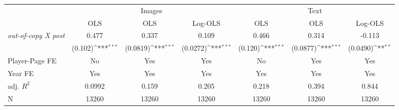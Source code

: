 {
\def\sym#1{\ifmmode^{#1}\else\(^{#1}\)\fi}
\begin{tabular*}{\hsize}{@{\hskip\tabcolsep\extracolsep\fill}l*{6}{c}}
\toprule
            &\multicolumn{3}{c}{Images}                                       &\multicolumn{3}{c}{Text}                                         \\\cmidrule(lr){2-4}\cmidrule(lr){5-7}
            &\multicolumn{1}{c}{OLS}&\multicolumn{1}{c}{OLS}&\multicolumn{1}{c}{Log-OLS}&\multicolumn{1}{c}{OLS}&\multicolumn{1}{c}{OLS}&\multicolumn{1}{c}{Log-OLS}\\
\midrule
\emph{out-of-copy X post}&       0.477         &       0.337         &       0.109         &       0.466         &       0.314         &      -0.113         \\
            &     (0.102)\sym{***}&    (0.0819)\sym{***}&    (0.0272)\sym{***}&     (0.120)\sym{***}&    (0.0877)\sym{***}&    (0.0490)\sym{**} \\
\midrule
Player-Page FE&          No         &         Yes         &         Yes         &          No         &         Yes         &         Yes         \\
Year FE     &         Yes         &         Yes         &         Yes         &         Yes         &         Yes         &         Yes         \\
adj. $R^2$  &      0.0992         &       0.159         &       0.205         &       0.218         &       0.394         &       0.844         \\
N           &       13260         &       13260         &       13260         &       13260         &       13260         &       13260         \\
\bottomrule
\end{tabular*}
}
